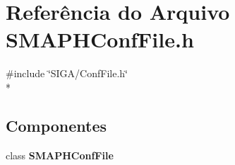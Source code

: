 \section{Referência do Arquivo S\+M\+A\+P\+H\+Conf\+File.\+h}
\label{_s_m_a_p_h_conf_file_8h}
{\ttfamily \#include \char`\"{}S\+I\+G\+A/\+Conf\+File.\+h\char`\"{}}\\*
\subsection*{Componentes}
\begin{DoxyCompactItemize}
\item 
class {\bf S\+M\+A\+P\+H\+Conf\+File}
\end{DoxyCompactItemize}
